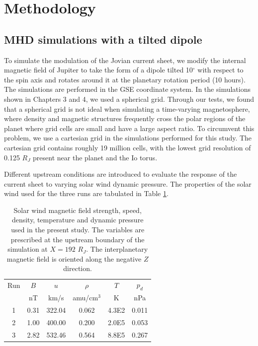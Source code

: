 \section{Methodology}

\subsection{MHD simulations with a tilted dipole}
To simulate the modulation of the Jovian current sheet, we modify the internal magnetic field of Jupiter to take the form of a dipole tilted 10$^\circ$ with respect to the spin axis and rotates around it at the planetary rotation period (10 hours). The simulations are performed in the GSE coordinate system. In the simulations shown in Chapters 3 and 4, we used a spherical grid. Through our tests, we found that a spherical grid is not ideal when simulating a time-varying magnetosphere, where density and magnetic structures frequently cross the polar regions of the planet where grid cells are small and have a large aspect ratio. To circumvent this problem, we use a cartesian grid in the simulations performed for this study. The cartesian grid contains roughly 19 million cells, with the lowest grid resolution of 0.125 $R_J$ present near the planet and the Io torus. 

Different upstream conditions are introduced to evaluate the response of the current sheet to varying solar wind dynamic pressure. The properties of the solar wind used for the three runs are tabulated in Table \ref{tab:sw-conditions-chp6}.

\begin{table}
    \centering
    \begin{tabular}{c|c|c|c|c|c}

    Run  &$B$  &$u$  &$\rho$     &$T$  &$p_d$\\
         &nT   &km/s &amu/cm$^3$ &K    &nPa\\
    \hline
    1    &0.31  &322.04  &0.062  &4.3E2  &0.011\\
    2    &1.00  &400.00  &0.200  &2.0E5  &0.053\\
    3    &2.82  &532.46  &0.564  &8.8E5  &0.267\\

    \end{tabular}
    \caption{Solar wind magnetic field strength, speed, density, temperature and dynamic pressure used in the present study. The variables are prescribed at the upstream boundary of the simulation at $X=192$ $R_J$. The interplanetary magnetic field is oriented along the negative $Z$ direction.}
    \label{tab:sw-conditions-chp6}
\end{table}

